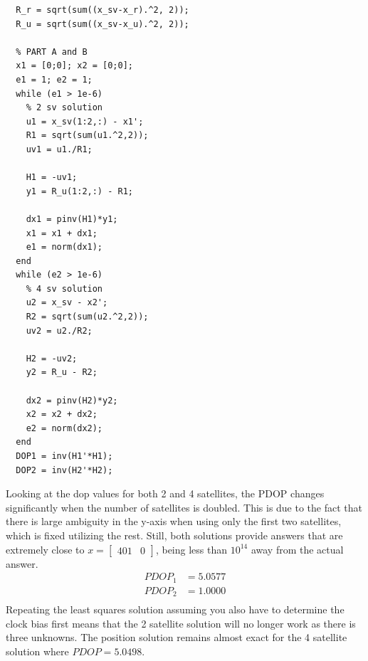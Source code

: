 \documentclass[11pt]{article}
\begin{document}
\begin{enumerate}[label=\textbf{\arabic*.}]
\begin{lstlisting}
  R_r = sqrt(sum((x_sv-x_r).^2, 2));
  R_u = sqrt(sum((x_sv-x_u).^2, 2));

  % PART A and B
  x1 = [0;0]; x2 = [0;0];
  e1 = 1; e2 = 1;
  while (e1 > 1e-6)
    % 2 sv solution
    u1 = x_sv(1:2,:) - x1';
    R1 = sqrt(sum(u1.^2,2));
    uv1 = u1./R1;

    H1 = -uv1;
    y1 = R_u(1:2,:) - R1;

    dx1 = pinv(H1)*y1;
    x1 = x1 + dx1;
    e1 = norm(dx1);
  end
  while (e2 > 1e-6)
    % 4 sv solution
    u2 = x_sv - x2';
    R2 = sqrt(sum(u2.^2,2));
    uv2 = u2./R2;

    H2 = -uv2;
    y2 = R_u - R2;

    dx2 = pinv(H2)*y2;
    x2 = x2 + dx2;
    e2 = norm(dx2);
  end
  DOP1 = inv(H1'*H1);
  DOP2 = inv(H2'*H2);
  \end{lstlisting}
  Looking at the dop values for both 2 and 4 satellites, the PDOP changes 
  significantly when the number of satellites is doubled. This is due to 
  the fact that there is large ambiguity in the y-axis when using only the 
  first two satellites, which is fixed utilizing the rest. Still, both solutions 
  provide answers that are extremely close to $x = \begin{bmatrix} 401 & 0 
  \end{bmatrix}$, being less than $10^{14}$ away from the actual answer. 
  \begin{equation*}
    \begin{split}
      PDOP_1 &= 5.0577 \\
      PDOP_2 &= 1.0000 \\
    \end{split}
  \end{equation*}
  Repeating the least squares solution assuming you also have to determine the 
  clock bias first means that the 2 satellite solution will no longer work as 
  there is three unknowns. The position solution remains almost exact for the 
  4 satellite solution where $PDOP = 5.0498$. \\


\end{enumerate}
\end{document}
